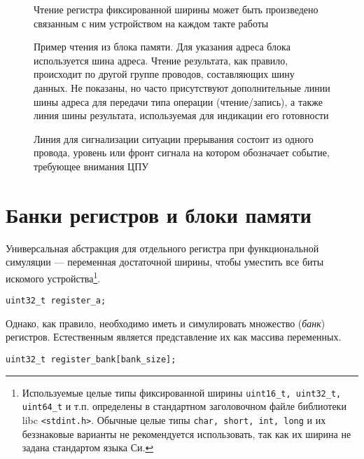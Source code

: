 \begin{figure}[htb]
    \centering
    \caption[Чтение регистра]{Чтение регистра фиксированной ширины может быть произведено связанным с ним устройством на каждом такте работы}
    \label{fig:register}
\end{figure}

\begin{figure}[htb]
    \centering
    \caption[Пример чтения из блока памяти]{Пример чтения из блока памяти. Для указания адреса блока используется шина адреса. Чтение результата, как правило, происходит по другой группе проводов, составляющих шину данных. Не показаны, но часто присутствуют дополнительные линии шины адреса для передачи типа операции (чтение/запись), а также линия шины результата, используемая для индикации его готовности}
    \label{fig:membus}
\end{figure}

\begin{figure}[htb]
    \centering
    \caption[Линия прерывания]{Линия для сигнализации ситуации прерывания состоит из одного провода, уровень или фронт сигнала на котором обозначает событие, требующее внимания ЦПУ}
    \label{fig:interrupt-line}
\end{figure}


\section{Банки регистров и блоки памяти}

Универсальная абстракция для отдельного регистра при функциональной симуляции — переменная достаточной ширины, чтобы уместить все биты искомого устройства\footnote{Используемые целые типы фиксированной ширины \texttt{uint16_t, uint32_t, uint64_t} и т.п. определены в стандартном заголовочном файле библиотеки libc \texttt{<stdint.h>}. Обычные целые типы \texttt{char, short, int, long} и их беззнаковые варианты не рекомендуется использовать, так как их ширина не задана стандартом языка Си.}.

\begin{lstlisting}
uint32_t register_a;
\end{lstlisting} 

Однако, как правило, необходимо иметь и симулировать множество (\textit{банк}) регистров. Естественным является представление их как массива переменных. 
\begin{lstlisting}
uint32_t register_bank[bank_size];
\end{lstlisting}

